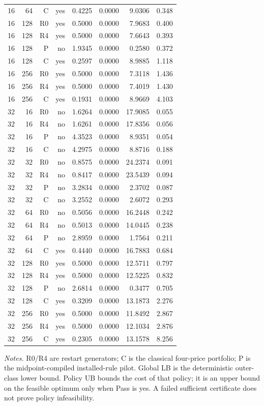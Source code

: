 {\begin{longtable}{lrrrrrrr}
16 & 64 & C & yes & 0.4225 & 0.0000 & 9.0306 & 0.348 \\
16 & 128 & R0 & yes & 0.5000 & 0.0000 & 7.9683 & 0.400 \\
16 & 128 & R4 & yes & 0.5000 & 0.0000 & 7.6643 & 0.393 \\
16 & 128 & P & no & 1.9345 & 0.0000 & 0.2580 & 0.372 \\
16 & 128 & C & yes & 0.2597 & 0.0000 & 8.9885 & 1.118 \\
16 & 256 & R0 & yes & 0.5000 & 0.0000 & 7.3118 & 1.436 \\
16 & 256 & R4 & yes & 0.5000 & 0.0000 & 7.4019 & 1.430 \\
16 & 256 & C & yes & 0.1931 & 0.0000 & 8.9669 & 4.103 \\
32 & 16 & R0 & no & 1.6264 & 0.0000 & 17.9085 & 0.055 \\
32 & 16 & R4 & no & 1.6261 & 0.0000 & 17.8356 & 0.056 \\
32 & 16 & P & no & 4.3523 & 0.0000 & 8.9351 & 0.054 \\
32 & 16 & C & no & 4.2975 & 0.0000 & 8.8716 & 0.188 \\
32 & 32 & R0 & no & 0.8575 & 0.0000 & 24.2374 & 0.091 \\
32 & 32 & R4 & no & 0.8417 & 0.0000 & 23.5439 & 0.094 \\
32 & 32 & P & no & 3.2834 & 0.0000 & 2.3702 & 0.087 \\
32 & 32 & C & no & 3.2552 & 0.0000 & 2.6072 & 0.293 \\
32 & 64 & R0 & no & 0.5056 & 0.0000 & 16.2448 & 0.242 \\
32 & 64 & R4 & no & 0.5013 & 0.0000 & 14.0445 & 0.238 \\
32 & 64 & P & no & 2.8959 & 0.0000 & 1.7564 & 0.211 \\
32 & 64 & C & yes & 0.4440 & 0.0000 & 16.7883 & 0.684 \\
32 & 128 & R0 & yes & 0.5000 & 0.0000 & 12.5711 & 0.797 \\
32 & 128 & R4 & yes & 0.5000 & 0.0000 & 12.5225 & 0.832 \\
32 & 128 & P & no & 2.6814 & 0.0000 & 0.3477 & 0.705 \\
32 & 128 & C & yes & 0.3209 & 0.0000 & 13.1873 & 2.276 \\
32 & 256 & R0 & yes & 0.5000 & 0.0000 & 11.8492 & 2.867 \\
32 & 256 & R4 & yes & 0.5000 & 0.0000 & 12.1034 & 2.876 \\
32 & 256 & C & yes & 0.2305 & 0.0000 & 13.1578 & 8.256 \\
\bottomrule\end{longtable}}
\noindent\emph{Notes.} R0/R4 are restart generators; C is the classical four-price portfolio; P is the midpoint-compiled installed-rule pilot. Global LB is the deterministic outer-class lower bound. Policy UB bounds the cost of that policy; it is an upper bound on the feasible optimum only when Pass is yes. A failed sufficient certificate does not prove policy infeasibility.
